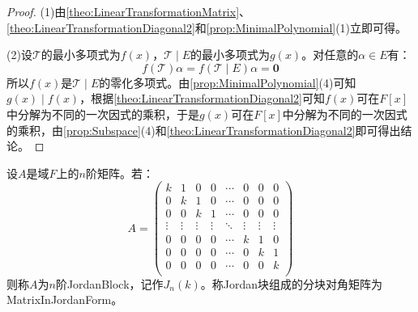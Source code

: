\begin{proof}
	(1)由\cref{theo:LinearTransformationMatrix}、\cref{theo:LinearTransformationDiagonal2}和\cref{prop:MinimalPolynomial}(1)立即可得。\par
	(2)设$\mathcal{T}$的最小多项式为$f(x)$，$\mathcal{T}\mid E$的最小多项式为$g(x)$。对任意的$\alpha\in E$有：
	\begin{equation*}
		f(\mathcal{T})\alpha=f(\mathcal{T}\mid E)\alpha=\mathbf{0}
	\end{equation*}
	所以$f(x)$是$\mathcal{T}\mid E$的零化多项式。由\cref{prop:MinimalPolynomial}(4)可知$g(x)\mid f(x)$，根据\cref{theo:LinearTransformationDiagonal2}可知$f(x)$可在$F[x]$中分解为不同的一次因式的乘积，于是$g(x)$可在$F[x]$中分解为不同的一次因式的乘积，由\cref{prop:Subspace}(4)和\cref{theo:LinearTransformationDiagonal2}即可得出结论。
\end{proof}
\begin{definition}
	设$A$是域$F$上的$n$阶矩阵。若：
	\begin{equation*}
		A=
		\begin{pmatrix}
			k & 1 & 0 & 0 & \cdots & 0 & 0 & 0 \\
			0 & k & 1 & 0 & \cdots & 0 & 0 & 0 \\
			0 & 0 & k & 1 & \cdots & 0 & 0 & 0 \\
			\vdots & \vdots & \vdots & \vdots & \ddots & \vdots & \vdots & \vdots \\
			0 & 0 & 0 & 0 & \cdots & k & 1 & 0 \\
			0 & 0 & 0 & 0 & \cdots & 0 & k & 1 \\
			0 & 0 & 0 & 0 & \cdots & 0 & 0 & k \\
		\end{pmatrix}
	\end{equation*}
	则称$A$为$n$阶\gls{JordanBlock}，记作$J_n(k)$。称Jordan块组成的分块对角矩阵为\gls{MatrixInJordanForm}。
\end{definition}

